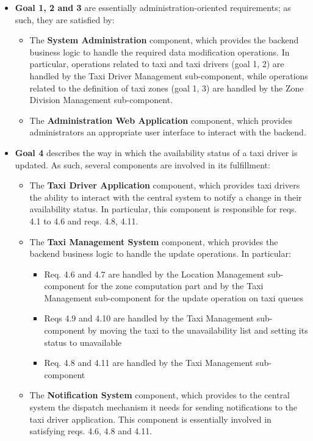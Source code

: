 \begin{itemize}
	\item \textbf{Goal 1, 2 and 3} are essentially administration-oriented requirements; as such, they are satisfied by:
	\begin{itemize}
	\item The \textbf{System Administration} component, which provides the backend business logic to handle the required data modification operations. In particular, operations related to taxi and taxi drivers (goal 1, 2) are handled by the Taxi Driver Management sub-component, while operations related to the definition of taxi zones (goal 1, 3) are handled by the Zone Division Management sub-component.
	\item The \textbf{Administration Web Application} component, which provides administrators an appropriate user interface to interact with the backend.
	\end{itemize}
	\item \textbf{Goal 4} describes the way in which the availability status of a taxi driver is updated. As such, several components are involved in its fulfillment:
	\begin{itemize}
	\item The \textbf{Taxi Driver Application} component, which provides taxi drivers the ability to interact with the central system to notify a change in their availability status. In particular, this component is responsible for reqs. 4.1 to 4.6 and reqs. 4.8, 4.11.
	\item The \textbf{Taxi Management System} component, which provides the backend business logic to handle the update operations. In particular:
	\begin{itemize}
	\item Req. 4.6 and 4.7 are handled by the Location Management sub-component for the zone computation part and by the Taxi Management sub-component for the update operation on taxi queues
	\item Reqs 4.9 and 4.10 are handled by the Taxi Management sub-component by moving the taxi to the unavailability list and setting its status to unavailable
	\item Req. 4.8 and 4.11 are handled by the Taxi Management sub-component
	\end{itemize}
	\item The \textbf{Notification System} component, which provides to the central system the dispatch mechanism it needs for sending notifications to the taxi driver application. This component is essentially involved in satisfying reqs. 4.6, 4.8 and 4.11.

\end{itemize}
\end{itemize}
